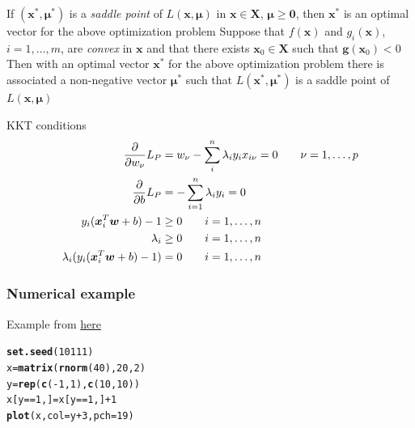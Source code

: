 \documentclass[aspectratio=169]{beamer}\usepackage[]{graphicx}\usepackage[]{xcolor}
\makeatletter
\newcommand{\hlnum}[1]{\textcolor[rgb]{0.686,0.059,0.569}{#1}}%
\newcommand{\hlopt}[1]{\textcolor[rgb]{0,0,0}{#1}}%
\newcommand{\hldef}[1]{\textcolor[rgb]{0.345,0.345,0.345}{#1}}%
\newcommand{\hlkwb}[1]{\textcolor[rgb]{0.69,0.353,0.396}{#1}}%
\newcommand{\hlkwc}[1]{\textcolor[rgb]{0.333,0.667,0.333}{#1}}%
\newcommand{\hlkwd}[1]{\textcolor[rgb]{0.737,0.353,0.396}{\textbf{#1}}}%
\newenvironment{kframe}{%
 \def\at@end@of@kframe{}%
 \ifinner\ifhmode%
  \def\at@end@of@kframe{\end{minipage}}%
  \begin{minipage}{\columnwidth}%
 \fi\fi%
 \def\FrameCommand##1{\hskip\@totalleftmargin \hskip-\fboxsep
 \colorbox{shadecolor}{##1}\hskip-\fboxsep
     \hskip-\linewidth \hskip-\@totalleftmargin \hskip\columnwidth}%
 \MakeFramed {\advance\hsize-\width
   \@totalleftmargin\z@ \linewidth\hsize
   \@setminipage}}%
 {\par\unskip\endMakeFramed%
 \at@end@of@kframe}
\newenvironment{knitrout}{}{} %
\makeatother
\begin{document}
\begin{frame}
    \begin{theorem}
        If $(\mathbf{x}^{\ast},\mathbf{\mu}^\ast)$ is a \emph{saddle point} of $L(\mathbf{x},\mathbf{\mu})$ in $\mathbf{x} \in \mathbf{X}$, $\mathbf{\mu} \geq \mathbf{0}$, then $\mathbf{x}^{\ast}$ is an optimal vector for the above optimization problem
        \vskip0.3cm
        Suppose that $f(\mathbf{x})$ and $g_i(\mathbf{x})$, $i = 1, \ldots, m$, are \emph{convex} in $\mathbf{x}$ and that there exists $\mathbf{x}_{0} \in \mathbf{X}$ such that $\mathbf{g}(\mathbf{x}_{0}) < 0$
        \vskip0.3cm
        Then with an optimal vector $\mathbf{x}^{\ast}$ for the above optimization problem there is associated a non-negative vector $\mathbf{\mu}^\ast$ such that $L(\mathbf{x}^{\ast},\mathbf{\mu}^\ast)$ is a saddle point of $L(\mathbf{x},\mathbf{\mu})$
    \end{theorem}
\end{frame}

\begin{frame}{KKT conditions}
    \begin{align*}
        \frac{\partial}{\partial w_\nu}L_P &=
        w_\nu-\sum_{i}^n\lambda_iy_ix_{i\nu}=0
        \qquad\nu=1,\ldots,p \\
        \frac{\partial}{\partial b}L_P &=
        -\sum_{i=1}^n \lambda_iy_i = 0 \\
        y_i(\bm{x}_i^T\bm{w}+b)-1 &\geq 0\qquad i=1,\ldots,n \\
        \lambda_i &\geq 0\qquad i=1,\ldots,n \\
        \lambda_i(y_i(\bm{x}_i^T\bm{w}+b)-1) &=0\qquad i=1,\ldots,n \\
    \end{align*}
\end{frame}


\begin{frame}[fragile]\frametitle{Numerical example}
Example from \href{https://www.datacamp.com/tutorial/support-vector-machines-r}{here}
\vfill
\begin{knitrout}
\color{fgcolor}\begin{kframe}
\begin{alltt}
\hlkwd{set.seed}\hldef{(}\hlnum{10111}\hldef{)}
\hldef{x} \hlkwb{=} \hlkwd{matrix}\hldef{(}\hlkwd{rnorm}\hldef{(}\hlnum{40}\hldef{),} \hlnum{20}\hldef{,} \hlnum{2}\hldef{)}
\hldef{y} \hlkwb{=} \hlkwd{rep}\hldef{(}\hlkwd{c}\hldef{(}\hlopt{-}\hlnum{1}\hldef{,} \hlnum{1}\hldef{),} \hlkwd{c}\hldef{(}\hlnum{10}\hldef{,} \hlnum{10}\hldef{))}
\hldef{x[y} \hlopt{==} \hlnum{1}\hldef{,]} \hlkwb{=} \hldef{x[y} \hlopt{==} \hlnum{1}\hldef{,]} \hlopt{+} \hlnum{1}
\hlkwd{plot}\hldef{(x,} \hlkwc{col} \hldef{= y} \hlopt{+} \hlnum{3}\hldef{,} \hlkwc{pch} \hldef{=} \hlnum{19}\hldef{)}
\end{alltt}
\end{kframe}
\end{knitrout}
\end{frame}
\end{document}

